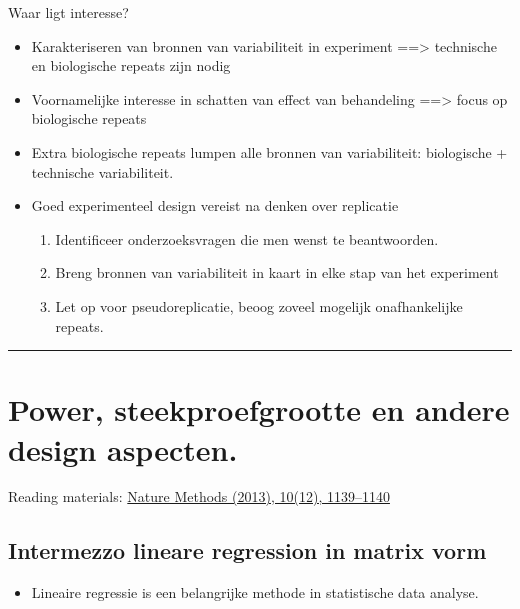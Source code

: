 \documentclass[
]{article}
\providecommand{\tightlist}{%
  \setlength{\itemsep}{0pt}\setlength{\parskip}{0pt}}
\begin{document}
Waar ligt interesse?

\begin{itemize}
\item
  Karakteriseren van bronnen van variabiliteit in experiment
  ==\textgreater{} technische en biologische repeats zijn nodig
\item
  Voornamelijke interesse in schatten van effect van behandeling
  ==\textgreater{} focus op biologische repeats
\item
  Extra biologische repeats lumpen alle bronnen van variabiliteit:
  biologische + technische variabiliteit.
\item
  Goed experimenteel design vereist na denken over replicatie

  \begin{enumerate}
  \def\labelenumi{\arabic{enumi}.}
  \tightlist
  \item
    Identificeer onderzoeksvragen die men wenst te beantwoorden.
  \item
    Breng bronnen van variabiliteit in kaart in elke stap van het
    experiment
  \item
    Let op voor pseudoreplicatie, beoog zoveel mogelijk onafhankelijke
    repeats.
  \end{enumerate}
\end{itemize}

\begin{center}\rule{0.5\linewidth}{0.5pt}\end{center}

\hypertarget{power-steekproefgrootte-en-andere-design-aspecten.}{%
\section{Power, steekproefgrootte en andere design
aspecten.}\label{power-steekproefgrootte-en-andere-design-aspecten.}}

Reading materials:
\href{https://www.nature.com/articles/nmeth.2738.pdf}{Nature Methods
(2013), 10(12), 1139--1140}

\hypertarget{intermezzo-lineare-regression-in-matrix-vorm}{%
\subsection{Intermezzo lineare regression in matrix
vorm}\label{intermezzo-lineare-regression-in-matrix-vorm}}

\begin{itemize}
\tightlist
\item
  Lineaire regressie is een belangrijke methode in statistische data
  analyse.
\end{itemize}
\end{document}
